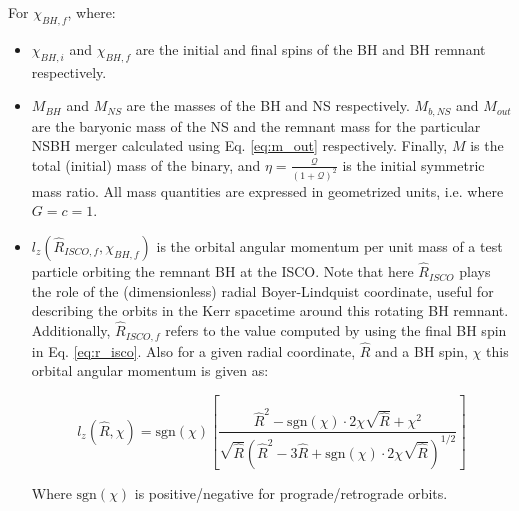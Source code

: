     For $\chi_{BH, f}$, where:

    \begin{itemize}

        \item $\chi_{BH, i}$ and $\chi_{BH, f}$ are the initial and final spins of the
            BH and BH remnant respectively.

        \item $M_{BH}$ and $M_{NS}$ are the masses of the BH and NS respectively. $M_{b,
            NS}$ and $M_{out}$ are the baryonic mass of the NS and the remnant mass for
            the particular NSBH merger calculated using Eq. \ref{eq:m_out} respectively.
            Finally, $M$ is the total (initial) mass of the binary, and $\eta =
            \frac{\mathcal{Q}}{(1 + \mathcal{Q})^2}$ is the initial symmetric mass
            ratio. All mass quantities are expressed in geometrized units, i.e. where $G
            = c = 1$.

        \item $l_z(\hat{R}_{ISCO, f}, \chi_{BH, f})$ is the orbital angular momentum per
            unit mass of a test particle orbiting the remnant BH at the ISCO. Note that
            here $\hat{R}_{ISCO}$ plays the role of the (dimensionless) radial
            Boyer-Lindquist coordinate, useful for describing the orbits in the Kerr
            spacetime around this rotating BH remnant. Additionally, $\hat{R}_{ISCO, f}$
            refers to the value computed by using the final BH spin in Eq.
            \ref{eq:r_isco}. Also for a given radial coordinate, $\hat{R}$ and a BH
            spin, $\chi$ this orbital angular momentum is given as:

            \begin{equation}
                l_z(\hat{R}, \chi) = \mathrm{sgn}(\chi)
                    \left[
                        \dfrac
                        {
                            \hat{R}^2 - \mathrm{sgn}(\chi) \cdot 2 \chi \sqrt{\hat{R}} +
                            \chi^2
                        }
                        {
                            \sqrt{\hat{R}}
                            (
                                \hat{R}^2 - 3\hat{R} + \mathrm{sgn}(\chi) \cdot 2 \chi
                                \sqrt{\hat{R}}
                            )^{1/2}
                        }
                    \right]
                \label{eq:AM_boyerlindquist}
            \end{equation}

            Where $\mathrm{sgn}(\chi)$ is positive/negative for prograde/retrograde
            orbits.


\end{itemize}
